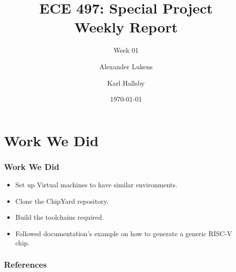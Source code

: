 \documentclass{../weeklyslides}
\title[Weekly Report]{ECE 497: Special Project \\ Weekly Report}
\subtitle{Week 01}
\author{Alexander Lukens \and Karl Hallsby}
\institute{Illinois Institute of Technology}
\date{\today}
\begin{document}
\nocite{chipyard}

\begin{frame}
  \titlepage{}
\end{frame}

\section{Work We Did}\label{sec:Work_We_Did}
\begin{frame}
  \frametitle{Work We Did}
  \begin{itemize}
  \item Set up Virtual machines to have similar environments.
  \item Clone the ChipYard repository.
  \item Build the toolchains required.
  \item Followed documentation's example on how to generate a generic RISC-V chip.
  \end{itemize}
\end{frame}


\begin{frame}
  \frametitle{References}
  \printbibliography[heading=bibintoc]{}
\end{frame}
\end{document}
